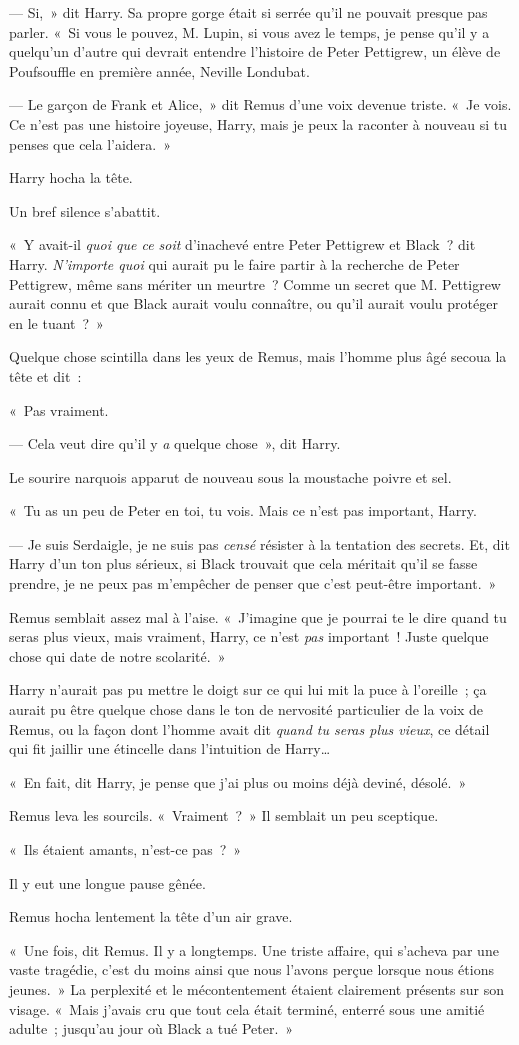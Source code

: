 --- Si,~» dit Harry.
Sa propre gorge était si serrée qu'il ne pouvait presque pas parler.
«~Si vous le pouvez, M. Lupin, si vous avez le temps, je pense qu'il y a quelqu'un d'autre qui devrait entendre l'histoire de Peter Pettigrew, un élève de Poufsouffle en première année, Neville Londubat.

--- Le garçon de Frank et Alice,~» dit Remus d'une voix devenue triste.
«~Je vois.
Ce n'est pas une histoire joyeuse, Harry, mais je peux la raconter à nouveau si tu penses que cela l'aidera.~»

Harry hocha la tête.

Un bref silence s'abattit.

«~Y avait-il \emph{quoi que ce soit} d'inachevé entre Peter Pettigrew et Black~? dit Harry.
\emph{N'importe quoi} qui aurait pu le faire partir à la recherche de Peter Pettigrew, même sans mériter un meurtre~?
Comme un secret que M. Pettigrew aurait connu et que Black aurait voulu connaître, ou qu'il aurait voulu protéger en le tuant~?~»

Quelque chose scintilla dans les yeux de Remus, mais l'homme plus âgé secoua la tête et dit~:

«~Pas vraiment.

--- Cela veut dire qu'il y \emph{a} quelque chose~», dit Harry.

Le sourire narquois apparut de nouveau sous la moustache poivre et sel.

«~Tu as un peu de Peter en toi, tu vois.
Mais ce n'est pas important, Harry.

--- Je suis Serdaigle, je ne suis pas \emph{censé} résister à la tentation des secrets.
Et, dit Harry d'un ton plus sérieux, si Black trouvait que cela méritait qu'il se fasse prendre, je ne peux pas m'empêcher de penser que c'est peut-être important.~»

Remus semblait assez mal à l'aise.
«~J'imagine que je pourrai te le dire quand tu seras plus vieux, mais vraiment, Harry, ce n'est \emph{pas} important~!
Juste quelque chose qui date de notre scolarité.~»

Harry n'aurait pas pu mettre le doigt sur ce qui lui mit la puce à l'oreille~; ça aurait pu être quelque chose dans le ton de nervosité particulier de la voix de Remus, ou la façon dont l'homme avait dit \emph{quand tu seras plus vieux}, ce détail qui fit jaillir une étincelle dans l'intuition de Harry…

«~En fait, dit Harry, je pense que j'ai plus ou moins déjà deviné, désolé.~»

Remus leva les sourcils.
«~Vraiment~?~»
 Il semblait un peu sceptique.

«~Ils étaient amants, n'est-ce pas~?~»

Il y eut une longue pause gênée.

Remus hocha lentement la tête d'un air grave.

«~Une fois, dit Remus.
Il y a longtemps.
Une triste affaire, qui s'acheva par une vaste tragédie, c'est du moins ainsi que nous l'avons perçue lorsque nous étions jeunes.~»
La perplexité et le mécontentement étaient clairement présents sur son visage.
«~Mais j'avais cru que tout cela était terminé, enterré sous une amitié adulte~; jusqu'au jour où Black a tué Peter.~»
